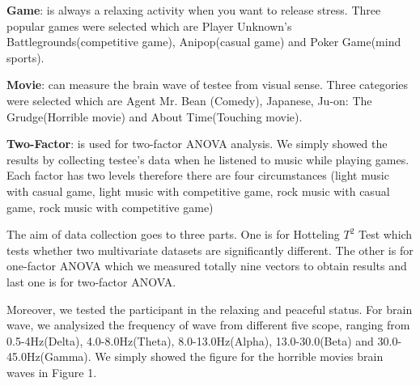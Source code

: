 \documentclass[letterpaper,twocolumn,10pt]{article}
\begin{document}
\noindent
{}
\setlength{\hangindent}{1em}
\textbf{Game}: is always a relaxing activity when you want to release stress. Three popular games were selected which are Player Unknown’s Battlegrounds(competitive game), Anipop(casual game) and Poker Game(mind sports).

\noindent
{}
\setlength{\hangindent}{1em}
\textbf{Movie}: can measure the brain wave of testee from visual sense. Three categories were selected which are Agent Mr. Bean (Comedy), Japanese, Ju-on: The Grudge(Horrible movie) and About Time(Touching movie).

\noindent
{}
\setlength{\hangindent}{1em}
\textbf{Two-Factor}: is used for two-factor ANOVA analysis. We simply showed the results by collecting testee's data when he listened to music while playing games. Each factor has two levels therefore there are four circumstances (light music with casual game, light music with competitive game, rock music with casual game, rock music with competitive game)

The aim of data collection goes to three parts. One is for Hotteling $T^2$ Test which tests whether two multivariate datasets are significantly different. The other is for one-factor ANOVA which we measured totally nine vectors to obtain results and last one is for two-factor ANOVA.

Moreover, we tested the participant in the relaxing and peaceful status. For brain wave, we analysized the frequency of wave from different five scope, ranging from 0.5-4Hz(Delta), 4.0-8.0Hz(Theta), 8.0-13.0Hz(Alpha), 13.0-30.0(Beta) and 30.0-45.0Hz(Gamma). We simply showed the figure for the horrible movies brain waves in Figure 1.
\end{document}
